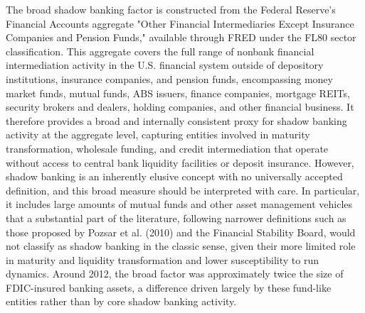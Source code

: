 \documentclass[12pt,a4paper]{report}
\begin{document}
The broad shadow banking factor is constructed from the Federal Reserve's Financial Accounts aggregate "Other Financial Intermediaries Except Insurance Companies and Pension Funds," available through FRED under the FL80 sector classification. This aggregate covers the full range of nonbank financial intermediation activity in the U.S. financial system outside of depository institutions, insurance companies, and pension funds, encompassing money market funds, mutual funds, ABS issuers, finance companies, mortgage REITs, security brokers and dealers, holding companies, and other financial business. It therefore provides a broad and internally consistent proxy for shadow banking activity at the aggregate level, capturing entities involved in maturity transformation, wholesale funding, and credit intermediation that operate without access to central bank liquidity facilities or deposit insurance. However, shadow banking is an inherently elusive concept with no universally accepted definition, and this broad measure should be interpreted with care. In particular, it includes large amounts of mutual funds and other asset management vehicles that a substantial part of the literature, following narrower definitions such as those proposed by Pozsar et al. (2010) and the Financial Stability Board, would not classify as shadow banking in the classic sense, given their more limited role in maturity and liquidity transformation and lower susceptibility to run dynamics. Around 2012, the broad factor was approximately twice the size of FDIC-insured banking assets, a difference driven largely by these fund-like entities rather than by core shadow banking activity.
\end{document}
